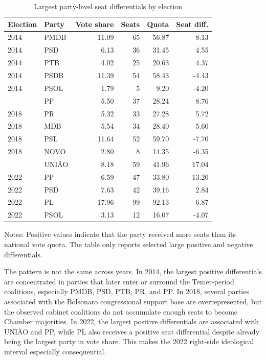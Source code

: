 \documentclass[11pt]{article}
\begin{document}
\begin{table}[htbp]
\centering
\caption{Largest party-level seat differentials by election}
\label{tab:party-diffs}
\small
\begin{tabular}{llrrrr}
\toprule
Election & Party & Vote share & Seats & Quota & Seat diff. \\
\midrule
2014 & PMDB & 11.09 & 65 & 56.87 & 8.13 \\
2014 & PSD & 6.13 & 36 & 31.45 & 4.55 \\
2014 & PTB & 4.02 & 25 & 20.63 & 4.37 \\
2014 & PSDB & 11.39 & 54 & 58.43 & -4.43 \\
2014 & PSOL & 1.79 & 5 & 9.20 & -4.20 \\
\addlinespace
2018 & PP & 5.50 & 37 & 28.24 & 8.76 \\
2018 & PR & 5.32 & 33 & 27.28 & 5.72 \\
2018 & MDB & 5.54 & 34 & 28.40 & 5.60 \\
2018 & PSL & 11.64 & 52 & 59.70 & -7.70 \\
2018 & NOVO & 2.80 & 8 & 14.35 & -6.35 \\
\addlinespace
2022 & UNIÃO & 8.18 & 59 & 41.96 & 17.04 \\
2022 & PP & 6.59 & 47 & 33.80 & 13.20 \\
2022 & PSD & 7.63 & 42 & 39.16 & 2.84 \\
2022 & PL & 17.96 & 99 & 92.13 & 6.87 \\
2022 & PSOL & 3.13 & 12 & 16.07 & -4.07 \\
\bottomrule
\end{tabular}
\begin{flushleft}
\footnotesize Notes: Positive values indicate that the party received more seats than its national vote quota. The table only reports selected large positive and negative differentials.
\end{flushleft}
\end{table}

The pattern is not the same across years. In 2014, the largest positive
differentials are concentrated in parties that later enter or surround the
Temer-period coalitions, especially PMDB, PSD, PTB, PR, and PP. In 2018,
several parties associated with the Bolsonaro congressional support base are
overrepresented, but the observed cabinet coalitions do not accumulate enough
seats to become Chamber majorities. In 2022, the largest positive differentials
are associated with UNIÃO and PP, while PL also receives a positive seat
differential despite already being the largest party in vote share. This makes
the 2022 right-side ideological interval especially consequential.
\end{document}
